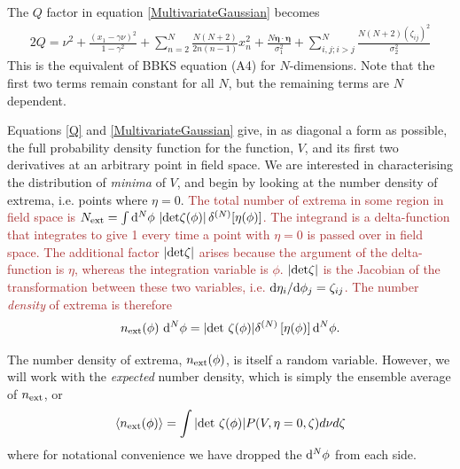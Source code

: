 \documentclass[12pt]{article}
\newcommand{\sh}[1]{\textcolor{brown}{#1}}
\begin{document}
The $Q$ factor in equation \eqref{MultivariateGaussian} becomes
%
\begin{equation} \label{Q}
\begin{split}
2Q = \nu^2 + \frac{(x_1-\gamma \nu)^2}{1-\gamma^2}+\sum_{n=2}^N\frac{N(N+2)}{2n(n-1)}x_n^2 + \frac{N \pmb{\eta}\cdot \pmb{\eta}}{\sigma_1^2} + \sum_{i,j;i > j}^N\frac{N(N+2)(\zeta_{ij})^2}{\sigma_2^2}
\end{split}
\end{equation}
%
This is the equivalent of BBKS equation (A4) for $N$-dimensions. Note that the first two terms remain constant for all $N$, but the remaining terms are $N$ dependent.  

Equations \eqref{Q} and \eqref{MultivariateGaussian} give, in as diagonal a form as possible, the full probability density function for the function, $V$, and its first two derivatives at an arbitrary point in field space. We are interested in characterising the distribution of \emph{minima} of $V$, and begin by looking at the number density of extrema, i.e. points where $\eta=0$. \sh{The total number of extrema in some region in field space is $N_{\rm ext} = \int {\rm d}^N\phi \, \left| {\rm det}\zeta(\phi)\right|\delta^{(N)}[\eta(\phi)]$. The integrand is a delta-function that integrates to give 1 every time a point with $\eta=0$ is passed over in field space. The additional factor $\left| {\rm det \zeta} \right|$ arises because the argument of the delta-function is $\eta$, whereas the integration variable is $\phi$. $|{\rm det}\zeta|$ is the Jacobian of the transformation between these two variables, i.e. ${\rm d}\eta_i/{\rm d}\phi_j = \zeta_{ij}$. The number \emph{density} of extrema is therefore}
%
\begin{equation}
n_{\rm ext}(\phi) \,\,{\rm d}^N \phi= |{\rm det}\,\, \zeta(\phi)| \delta^{(N)}\left[ \eta(\phi)\right] {\rm d}^N \phi.
\end{equation}

%
The number density of extrema, $n_{\rm ext}(\phi)$, is itself a random variable. However, we will work with the \emph{expected} number density, which is simply the ensemble average of $n_{\rm ext}$, or
% 
\begin{equation} \label{NumberDensity}
\langle n_{\rm ext}(\phi)  \rangle= \int |{\rm det}\,\, \zeta(\phi)| P(V,\eta=0,\zeta)d\nu d\zeta
\end{equation}
where for notational convenience we have dropped the ${\rm d}^N \phi$ from each side.
\end{document}
